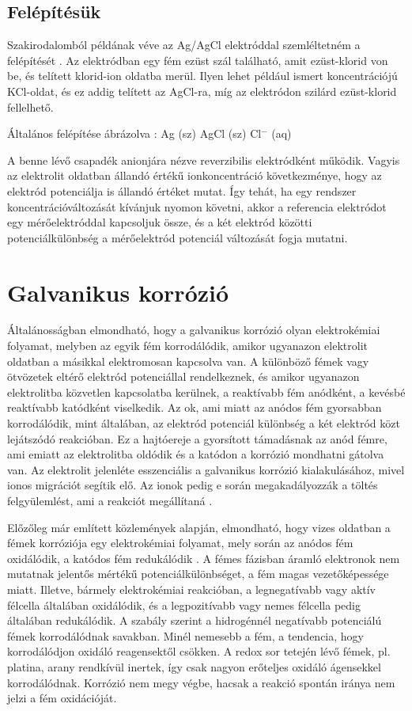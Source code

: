 \subsection{Felépítésük}

Szakirodalomból példának véve az Ag/AgCl elektróddal szemléltetném a felépítését \cite{janz1968silver}. Az elektródban egy fém ezüst szál található, amit ezüst-klorid von be, és telített klorid-ion oldatba merül. Ilyen lehet például ismert koncentrációjú KCl-oldat, és ez addig telített az AgCl-ra, míg az elektródon szilárd ezüst-klorid fellelhető.

Általános felépítése ábrázolva : Ag (sz) AgCl (sz) Cl$^-$ (aq)

A benne lévő csapadék anionjára nézve reverzibilis elektródként működik. Vagyis az elektrolit oldatban állandó értékű ionkoncentráció következménye, hogy az elektród potenciálja is állandó értéket mutat. Így tehát, ha egy rendszer koncentrációváltozását kívánjuk nyomon követni, akkor a referencia elektródot egy mérőelektróddal kapcsoljuk össze, és a két elektród közötti potenciálkülönbség a mérőelektród potenciál változását fogja mutatni.

\section{Galvanikus korrózió}

Általánosságban elmondható, hogy a galvanikus korrózió olyan elektrokémiai folyamat, melyben az egyik fém korrodálódik, amikor ugyanazon elektrolit oldatban a másikkal elektromosan kapcsolva van. A különböző fémek vagy ötvözetek eltérő elektród potenciállal rendelkeznek, és amikor ugyanazon elektrolitba közvetlen kapcsolatba kerülnek, a reaktívabb fém anódként, a kevésbé reaktívabb katódként viselkedik. Az ok, ami miatt az anódos fém gyorsabban korrodálódik, mint általában, az elektród potenciál különbség a két elektród közt lejátszódó reakcióban. Ez a hajtóereje a gyorsított támadásnak az anód fémre, ami emiatt az elektrolitba oldódik és a katódon a korrózió mondhatni gátolva van. Az elektrolit jelenléte esszenciális a galvanikus korrózió kialakulásához, mivel ionos migrációt segítik elő. Az ionok pedig e során megakadályozzák a töltés felgyülemlést, ami a reakciót megállítaná \cite{fontana2018corrosion}. 

Előzőleg már említett közlemények alapján, elmondható, hogy vizes oldatban a fémek korróziója egy elektrokémiai folyamat, mely során az anódos fém oxidálódik, a katódos fém redukálódik \cite{isaacs1981scanning}. A fémes fázisban áramló elektronok nem mutatnak jelentős mértékű potenciálkülönbséget, a fém magas vezetőképessége miatt. Illetve, bármely elektrokémiai reakcióban, a legnegatívabb vagy aktív félcella általában oxidálódik, és a legpozitívabb vagy nemes félcella pedig általában redukálódik. A szabály szerint a hidrogénnél negatívabb potenciálú fémek korrodálódnak savakban. Minél nemesebb a fém, a tendencia, hogy korrodálódjon oxidáló reagensektől csökken. A redox sor tetején lévő fémek, pl. platina, arany rendkívül inertek, így csak nagyon erőteljes oxidáló ágensekkel korrodálódnak. Korrózió nem megy végbe, hacsak a reakció spontán iránya nem jelzi a fém oxidációját.

